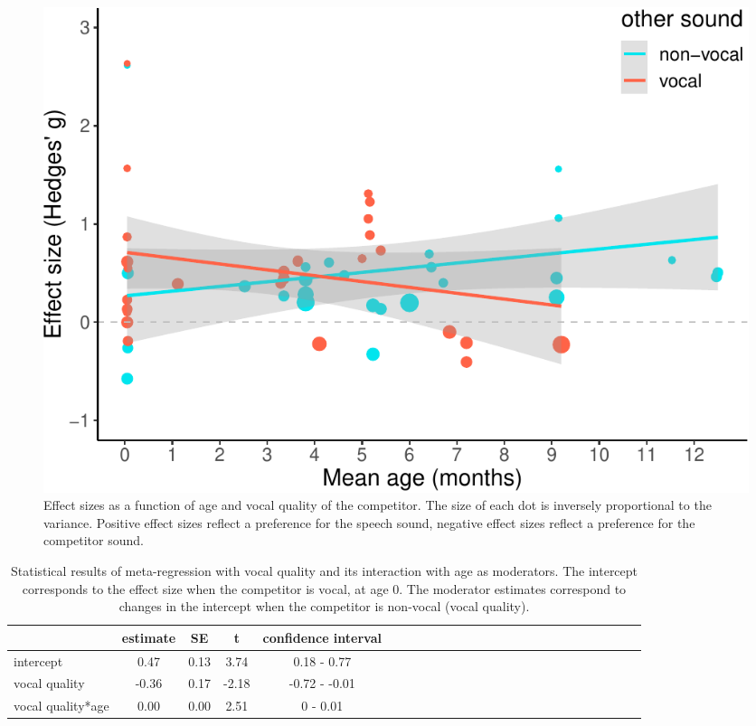 \documentclass[man]{apa6}
\begin{document}
\begin{figure}
\centering
\includegraphics{MA_speech_pref_files/figure-latex/vocal-1.pdf}
\caption{\label{fig:vocal}Effect sizes as a function of age and vocal quality of the competitor. The size of each dot is inversely proportional to the variance. Positive effect sizes reflect a preference for the speech sound, negative effect sizes reflect a preference for the competitor sound.}
\end{figure}

\begin{table}[tbp]
\begin{center}
\begin{threeparttable}
\caption{\label{tab:TableVocal}Statistical results of meta-regression with vocal quality and its interaction with age as moderators. The intercept corresponds to the effect size when the competitor is vocal, at age 0. The moderator estimates correspond to changes in the intercept when the competitor is non-vocal (vocal quality).}
\begin{tabular}{lcccclcccclcccclcccclcccc}
\toprule
 & estimate & SE & t & confidence interval\\
\midrule
intercept & 0.47 & 0.13 & 3.74 & 0.18 - 0.77\\
vocal quality & -0.36 & 0.17 & -2.18 & -0.72 - -0.01\\
vocal quality*age & 0.00 & 0.00 & 2.51 & 0 - 0.01\\
\bottomrule
\end{tabular}
\end{threeparttable}
\end{center}
\end{table}
\end{document}
